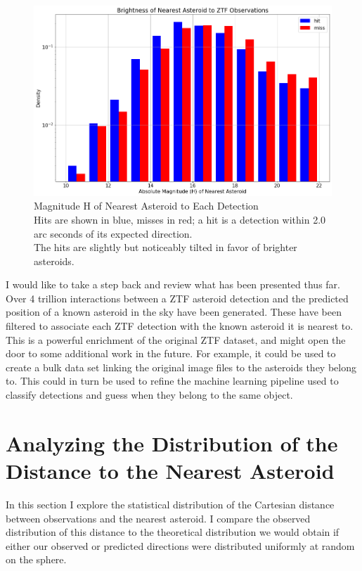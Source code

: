 \begin{figure}[hbt!]
\begin{center}
\includegraphics[width=1.0\textwidth]{../figs/ztf/nearest_ast_brightness.png}
\caption[Magnitude H of Nearest Asteroid to Each Detection]
{Magnitude H of Nearest Asteroid to Each Detection\\
Hits are shown in blue, misses in red; a hit is a detection within 2.0 arc seconds of its expected direction.\\
The hits are slightly but noticeably tilted in favor of brighter asteroids.}
\end{center}
\end{figure}

I would like to take a step back and review what has been presented thus far.
Over 4 trillion interactions between a ZTF asteroid detection and the predicted position of a known asteroid in the sky have been generated.
These have been filtered to associate each ZTF detection with the known asteroid it is nearest to.
This is a powerful enrichment of the original ZTF dataset, and might open the door to some additional work in the future.
For example, it could be used to create a bulk data set linking the original image files to the asteroids they belong to.
This could in turn be used to refine the machine learning pipeline used to classify detections and guess when they belong to the same object.

\section{Analyzing the Distribution of the Distance to the Nearest Asteroid}
\label{section_nearest_ast_distribution}
In this section I explore the statistical distribution of the Cartesian distance between observations and the nearest asteroid.
I compare the observed distribution of this distance to the theoretical distribution we would obtain 
if either our observed or predicted directions were distributed uniformly at random on the sphere.

